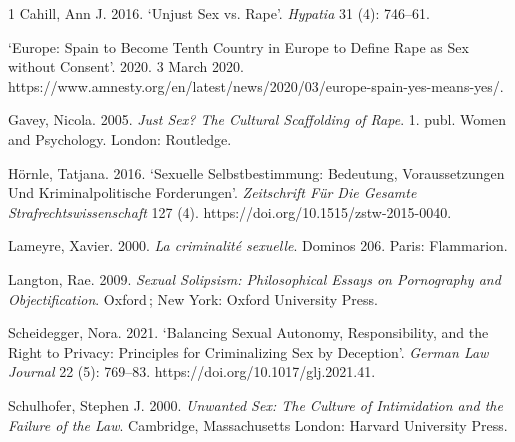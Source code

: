 \begin{hangparas}{\hangingindent}{1}
Cahill, Ann J. 2016. `Unjust Sex vs. Rape'. \emph{Hypatia} 31 (4):
746--61.

`Europe: Spain to Become Tenth Country in Europe to Define Rape as Sex
without Consent'. 2020. 3 March 2020.
https://www.amnesty.org/en/latest/news/2020/03/europe-spain-yes-means-yes/.

Gavey, Nicola. 2005. \emph{Just Sex? The Cultural Scaffolding of Rape}.
1. publ. Women and Psychology. London: Routledge.

Hörnle, Tatjana. 2016. `Sexuelle Selbstbestimmung: Bedeutung,
Voraussetzungen Und Kriminalpolitische Forderungen'. \emph{Zeitschrift
Für Die Gesamte Strafrechtswissenschaft} 127 (4). \newline
https://doi.org/10.1515/zstw-2015-0040.

Lameyre, Xavier. 2000. \emph{La criminalité sexuelle}. Dominos 206.
Paris: Flammarion.

Langton, Rae. 2009. \emph{Sexual Solipsism: Philosophical Essays on
Pornography and Objectification}. Oxford\,; New York: Oxford University
Press.

Scheidegger, Nora. 2021. `Balancing Sexual Autonomy, Responsibility, and
the Right to Privacy: Principles for Criminalizing Sex by Deception'.
\emph{German Law Journal} 22 (5): 769--83. \newline
https://doi.org/10.1017/glj.2021.41.

Schulhofer, Stephen J. 2000. \emph{Unwanted Sex: The Culture of
Intimidation and the Failure of the Law}. Cambridge, Massachusetts
London: Harvard University Press.
\end{hangparas}

